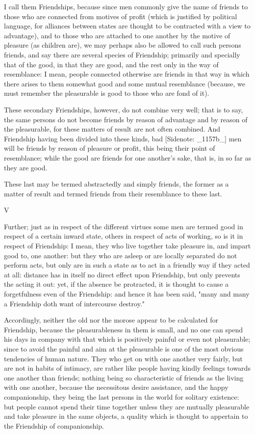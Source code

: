 I call them Friendships, because since men commonly give the name of
friends to those who are connected from motives of profit (which is
justified by political language, for alliances between states are
thought to be contracted with a view to advantage), and to those who are
attached to one another by the motive of pleasure (as children are), we
may perhaps also be allowed to call such persons friends, and say there
are several species of Friendship; primarily and specially that of
the good, in that they are good, and the rest only in the way of
resemblance: I mean, people connected otherwise are friends in that way
in which there arises to them somewhat good and some mutual resemblance
(because, we must remember the pleasurable is good to those who are fond
of it).

These secondary Friendships, however, do not combine very well; that is
to say, the same persons do not become friends by reason of advantage
and by reason of the pleasurable, for these matters of result are not
often combined. And Friendship having been divided into these kinds, bad
[Sidenote: _1157b_] men will be friends by reason of pleasure or profit,
this being their point of resemblance; while the good are friends for
one another's sake, that is, in so far as they are good.

These last may be termed abstractedly and simply friends, the former as
a matter of result and termed friends from their resemblance to these
last.


V

Further; just as in respect of the different virtues some men are termed
good in respect of a certain inward state, others in respect of acts
of working, so is it in respect of Friendship: I mean, they who live
together take pleasure in, and impart good to, one another: but they who
are asleep or are locally separated do not perform acts, but only are in
such a state as to act in a friendly way if they acted at all: distance
has in itself no direct effect upon Friendship, but only prevents the
acting it out: yet, if the absence be protracted, it is thought to cause
a forgetfulness even of the Friendship: and hence it has been said,
"many and many a Friendship doth want of intercourse destroy."

Accordingly, neither the old nor the morose appear to be calculated for
Friendship, because the pleasurableness in them is small, and no one can
spend his days in company with that which is positively painful or even
not pleasurable; since to avoid the painful and aim at the pleasurable
is one of the most obvious tendencies of human nature. They who get on
with one another very fairly, but are not in habits of intimacy, are
rather like people having kindly feelings towards one another than
friends; nothing being so characteristic of friends as the living with
one another, because the necessitous desire assistance, and the happy
companionship, they being the last persons in the world for solitary
existence: but people cannot spend their time together unless they are
mutually pleasurable and take pleasure in the same objects, a quality
which is thought to appertain to the Friendship of companionship.

